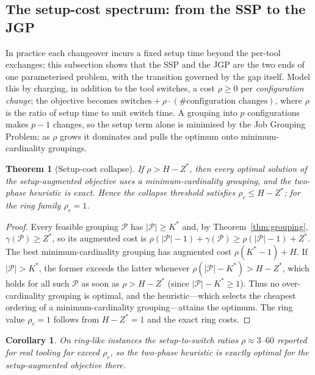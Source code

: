 \documentclass[11pt,a4paper]{article}
\theoremstyle{plain}
\newtheorem{theorem}{Theorem}
\newtheorem{corollary}{Corollary}
\theoremstyle{definition}
\theoremstyle{remark}
\newcommand{\Kst}{K^{\ast}}
\newcommand{\Zst}{Z^{\ast}}
\begin{document}
\subsection{The setup-cost spectrum: from the SSP to the JGP}\label{ssec:collapse}
In practice each changeover incurs a fixed setup time beyond the per-tool exchanges;
this subsection shows that the SSP and the JGP are the two ends of one parameterised
problem, with the transition governed by the gap itself.
Model this by charging, in addition to the tool switches, a cost $\rho\ge0$ per
\emph{configuration change}; the objective becomes
$\text{switches}+\rho\cdot(\#\text{configuration changes})$, where $\rho$ is the
ratio of setup time to unit switch time. A grouping into $p$ configurations makes
$p-1$ changes, so the setup term alone is minimised by the Job Grouping Problem;
as $\rho$ grows it dominates and pulls the optimum onto minimum-cardinality
groupings.
\begin{theorem}[Setup-cost collapse]\label{thm:collapse}
If $\rho> H-\Zst$, then every optimal solution of the setup-augmented objective uses
a minimum-cardinality grouping, and the two-phase heuristic is exact. Hence the
collapse threshold satisfies $\rho_c\le H-\Zst$; for the ring family $\rho_c=1$.
\end{theorem}
\begin{proof}
Every feasible grouping $\mathcal{P}$ has $\lvert\mathcal{P}\rvert\ge\Kst$ and, by
Theorem~\ref{thm:grouping}, $\gamma(\mathcal{P})\ge\Zst$, so its augmented cost is
$\rho(\lvert\mathcal{P}\rvert-1)+\gamma(\mathcal{P})\ge\rho(\lvert\mathcal{P}
\rvert-1)+\Zst$. The best minimum-cardinality grouping has augmented cost
$\rho(\Kst-1)+H$. If $\lvert\mathcal{P}\rvert>\Kst$, the former exceeds the latter
whenever $\rho(\lvert\mathcal{P}\rvert-\Kst)>H-\Zst$, which holds for all such
$\mathcal{P}$ as soon as $\rho>H-\Zst$ (since $\lvert\mathcal{P}\rvert-\Kst\ge1$).
Thus no over-cardinality grouping is optimal, and the heuristic---which selects the
cheapest ordering of a minimum-cardinality grouping---attains the optimum. The ring
value $\rho_c=1$ follows from $H-\Zst=1$ and the exact ring costs.
\end{proof}
\begin{corollary}\label{cor:manufacturing}
On ring-like instances the setup-to-switch ratios $\rho\approx3$--$60$ reported for
real tooling \citep{Privault1995,Privault2000} far exceed $\rho_c$, so the two-phase
heuristic is exactly optimal for the setup-augmented objective there.
\end{corollary}
\end{document}
